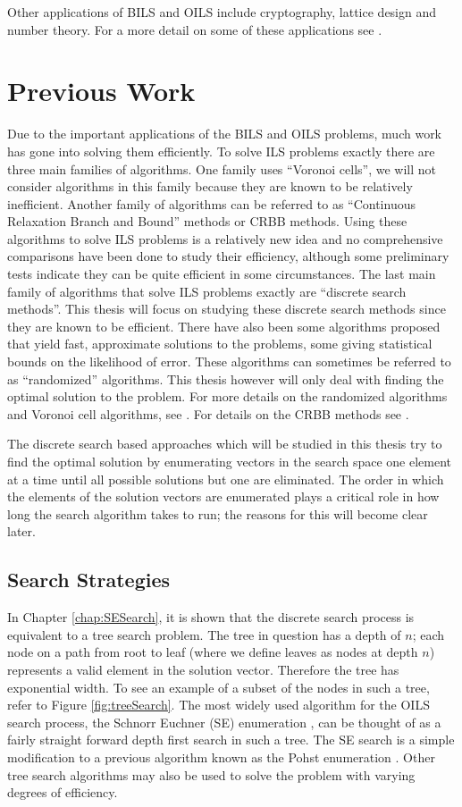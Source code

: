 \documentclass[12pt,Bold,letterpaper]{mcgilletdclass}
\newcommand{\vsp}{\vspace{\baselineskip}}
\begin{document}
Other applications of BILS and OILS include cryptography, lattice design and number theory. For a more detail on some of these applications see \cite{HanPS11}.

\vsp \section{Previous Work} \label{sec:prevWork}
Due to the important applications of the BILS and OILS problems, much work has
gone into solving them efficiently. To solve ILS problems exactly there are
three main families of algorithms. One family uses ``Voronoi cells'', we will
not consider algorithms in this family because they are known to be relatively
inefficient. Another family of algorithms can be referred to as ``Continuous
Relaxation Branch and Bound'' methods or CRBB methods. Using these algorithms to solve ILS
problems is a relatively new idea and no comprehensive comparisons have been
done to study their efficiency, although some preliminary tests indicate they
can be quite efficient in some circumstances. The last main family of algorithms
that solve ILS problems exactly are ``discrete search methods''. This thesis
will focus on studying these discrete search methods since they are known to be
efficient. There have also been some algorithms proposed that yield fast,
approximate solutions to the problems, some giving statistical bounds on the
likelihood of error. These algorithms can sometimes be referred to as
``randomized'' algorithms. This thesis however will only deal with finding the
optimal solution to the problem. For more details on the randomized algorithms
and Voronoi cell algorithms, see \cite{HanPS11}. For details on the CRBB methods
see \cite{Ku11}. 

The discrete search based approaches which will be studied in this thesis try to find the optimal solution by enumerating vectors in the search space one element at a time until all possible solutions but one are eliminated. The order in which the elements of the solution vectors are enumerated plays a critical role in how long the search algorithm takes to run; the reasons for this will become clear later.

\vsp \subsection{Search Strategies}
In Chapter \ref{chap:SESearch}, it is shown that the discrete search process is equivalent to a tree search problem. The tree in question has a depth of $n$; each node on a path from root to leaf (where we define leaves as nodes at depth $n$) represents a valid element in the solution vector. Therefore the tree has exponential width. To see an example of a subset of the nodes in such a tree, refer to Figure \ref{fig:treeSearch}. The most widely used algorithm for the OILS search process, the Schnorr Euchner (SE) enumeration \cite{SchE94}, can be thought of as a fairly straight forward depth first search in such a tree. The SE search is a simple modification to a previous algorithm known as the Pohst enumeration \cite{Pho81}. Other tree search algorithms may also be used to solve the problem with varying degrees of efficiency.
\end{document}
